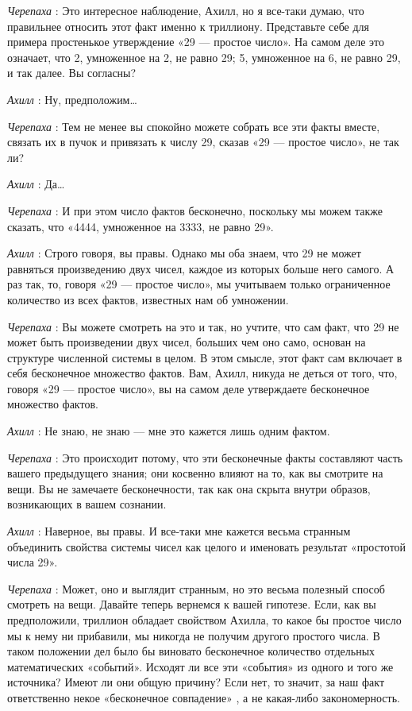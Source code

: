 \emph{Черепаха} : Это интересное наблюдение, Ахилл, но я все-таки думаю, что правильнее относить этот факт именно к триллиону. Представьте себе для примера простенькое утверждение «29 --- простое число». На самом деле это означает, что 2, умноженное на 2, не равно 29; 5, умноженное на 6, не равно 29, и так далее. Вы согласны?

\emph{Ахилл} : Ну, предположим\ldots{}

\emph{Черепаха} : Тем не менее вы спокойно можете собрать все эти факты вместе, связать их в пучок и привязать к числу 29, сказав «29 --- простое число», не так ли?

\emph{Ахилл} : Да\ldots{}

\emph{Черепаха} : И при этом число фактов бесконечно, поскольку мы можем также сказать, что «4444, умноженное на 3333, не равно 29».

\emph{Ахилл} : Строго говоря, вы правы. Однако мы оба знаем, что 29 не может равняться произведению двух чисел, каждое из которых больше него самого. А раз так, то, говоря «29 --- простое число», мы учитываем только ограниченное количество из всех фактов, известных нам об умножении.

\emph{Черепаха} : Вы можете смотреть на это и так, но учтите, что сам факт, что 29 не может быть произведении двух чисел, больших чем оно само, основан на структуре численной системы в целом. В этом смысле, этот факт сам включает в себя бесконечное множество фактов. Вам, Ахилл, никуда не деться от того, что, говоря «29 --- простое число», вы на самом деле утверждаете бесконечное множество фактов.

\emph{Ахилл} : Не знаю, не знаю --- мне это кажется лишь одним фактом.

\emph{Черепаха} : Это происходит потому, что эти бесконечные факты составляют часть вашего предыдущего знания; они косвенно влияют на то, как вы смотрите на вещи. Вы не замечаете бесконечности, так как она скрыта внутри образов, возникающих в вашем сознании.

\emph{Ахилл} : Наверное, вы правы. И все-таки мне кажется весьма странным объединить свойства системы чисел как целого и именовать результат «простотой числа 29».

\emph{Черепаха} : Может, оно и выглядит странным, но это весьма полезный способ смотреть на вещи. Давайте теперь вернемся к вашей гипотезе. Если, как вы предположили, триллион обладает свойством Ахилла, то какое бы простое число мы к нему ни прибавили, мы никогда не получим другого простого числа. В таком положении дел было бы виновато бесконечное количество отдельных математических «событий». Исходят ли все эти «события» из одного и того же источника? Имеют ли они общую причину? Если нет, то значит, за наш факт ответственно некое «бесконечное совпадение» , а не какая-либо закономерность.

